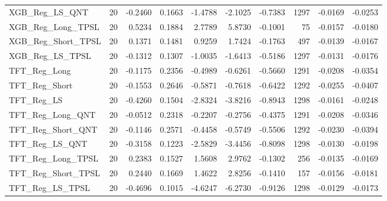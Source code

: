 \begin{tabular}{llrrrrrrrr}
\cline{1-10}
XGB\_Reg\_LS\_QNT & 20 & -0.2460 & 0.1663 & -1.4788 & -2.1025 & -0.7383 & 1297 & -0.0169 & -0.0253 \\
\cline{1-10}
XGB\_Reg\_Long\_TPSL & 20 & 0.5234 & 0.1884 & 2.7789 & 5.8730 & -0.1001 & 75 & -0.0157 & -0.0180 \\
\cline{1-10}
XGB\_Reg\_Short\_TPSL & 20 & 0.1371 & 0.1481 & 0.9259 & 1.7424 & -0.1763 & 497 & -0.0139 & -0.0167 \\
\cline{1-10}
XGB\_Reg\_LS\_TPSL & 20 & -0.1312 & 0.1307 & -1.0035 & -1.6413 & -0.5186 & 1297 & -0.0131 & -0.0176 \\
\cline{1-10}
TFT\_Reg\_Long & 20 & -0.1175 & 0.2356 & -0.4989 & -0.6261 & -0.5660 & 1291 & -0.0208 & -0.0354 \\
\cline{1-10}
TFT\_Reg\_Short & 20 & -0.1553 & 0.2646 & -0.5871 & -0.7618 & -0.6422 & 1292 & -0.0255 & -0.0407 \\
\cline{1-10}
TFT\_Reg\_LS & 20 & -0.4260 & 0.1504 & -2.8324 & -3.8216 & -0.8943 & 1298 & -0.0161 & -0.0248 \\
\cline{1-10}
TFT\_Reg\_Long\_QNT & 20 & -0.0512 & 0.2318 & -0.2207 & -0.2756 & -0.4375 & 1291 & -0.0208 & -0.0346 \\
\cline{1-10}
TFT\_Reg\_Short\_QNT & 20 & -0.1146 & 0.2571 & -0.4458 & -0.5749 & -0.5506 & 1292 & -0.0230 & -0.0394 \\
\cline{1-10}
TFT\_Reg\_LS\_QNT & 20 & -0.3158 & 0.1223 & -2.5829 & -3.4456 & -0.8098 & 1298 & -0.0130 & -0.0198 \\
\cline{1-10}
TFT\_Reg\_Long\_TPSL & 20 & 0.2383 & 0.1527 & 1.5608 & 2.9762 & -0.1302 & 256 & -0.0135 & -0.0169 \\
\cline{1-10}
TFT\_Reg\_Short\_TPSL & 20 & 0.2440 & 0.1669 & 1.4622 & 2.8256 & -0.1410 & 157 & -0.0156 & -0.0181 \\
\cline{1-10}
TFT\_Reg\_LS\_TPSL & 20 & -0.4696 & 0.1015 & -4.6247 & -6.2730 & -0.9126 & 1298 & -0.0129 & -0.0173 \\
\cline{1-10}
\bottomrule
\end{tabular}
